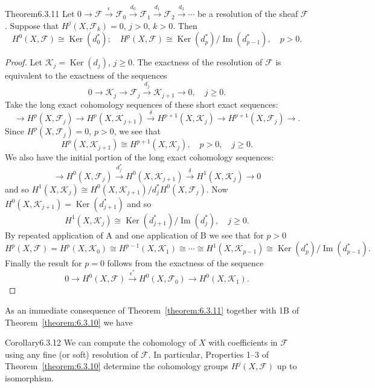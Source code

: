 \begin{originaltheorem}{Theorem}{6.3.11}
Let $0\to\mathcal F\xrightarrow\epsilon\mathcal F_0\xrightarrow{d_0}\mathcal F_1\xrightarrow{d_1}\mathcal F_2\xrightarrow{d_2}\cdots$ be a resolution of the sheaf $\mathcal F$. Suppose that $H^j(X,\mathcal F_k)=0$, $j>0$, $k>0$. Then
\[
H^0(X,\mathcal F)\cong\operatorname{Ker}(d_0^*);\quad H^p(X,\mathcal F)\cong\operatorname{Ker}(d_p^*)/\operatorname{Im}(d_{p-1}^*),\quad p>0.
\]
\end{originaltheorem}
\begin{proof}
Let $\mathcal K_j=\operatorname{Ker}(d_j)$, $j\geq0$. The exactness of the resolution of $\mathcal F$ is equivalent to the exactness of the sequences
\[
0\to\mathcal K_j\to\mathcal F_j\xrightarrow{d_j}\mathcal K_{j+1}\to0,\quad j\geq0.
\]
Take the long exact cohomology sequences of these short exact sequences:
\[
\to H^p(X,\mathcal F_j)\to H^p(X,\mathcal K_{j+1})\xrightarrow\delta H^{p+1}(X,\mathcal K_j)\to H^{p+1}(X,\mathcal F_j)\to.
\]
Since $H^p(X,\mathcal F_j)=0$, $p>0$, we see that
\begin{equation}\tag{A}\label{eq:6:a:1}
H^p(X,\mathcal K_{j+1})\cong H^{p+1}(X,\mathcal K_j),\quad p>0,\quad j\geq0.
\end{equation}
We also have the initial portion of the long exact cohomology sequences:
\[
\to H^0(X,\mathcal F_j)\xrightarrow{d_j^*}H^0(X,\mathcal K_{j+1})\xrightarrow\delta H^1(X,\mathcal K_j)\to0
\]
and so $H^1(X,\mathcal K_j)\cong H^0(X,\mathcal K_{j+1})/d_j^*H^0(X,\mathcal F_j)$. Now $H^0(X,\mathcal K_{j+1})=\operatorname{Ker}(d_{j+1}^*)$ and so
\begin{equation}\tag{B}\label{eq:6:b:1}
H^1(X,\mathcal K_j)\cong\operatorname{Ker}(d_{j+1}^*)/\operatorname{Im}(d_j^*),\quad j\geq0.
\end{equation}
By repeated application of A and one application of B we see that for $p>0$
\[
H^p(X,\mathcal F)=H^p(X,\mathcal K_0)\cong H^{p-1}(X,\mathcal K_1)\cong\cdots\cong H^1(X,\mathcal K_{p-1})\cong\operatorname{Ker}(d_p^*)/\operatorname{Im}(d_{p-1}^*).
\]
Finally the result for $p=0$ follows from the exactness of the sequence
\[
0\to H^0(X,\mathcal F)\xrightarrow{\epsilon^*}H^0(X,\mathcal F_0)\to H^0(X,\mathcal K_1).
\]
\end{proof}
As an immediate consequence of Theorem~\ref{theorem:6.3.11} together with 1B of Theorem~\ref{theorem:6.3.10} we have
\begin{originaltheorem}{Corollary}{6.3.12}
We can compute the cohomology of $X$ with coefficients in $\mathcal F$ using any fine (or soft) resolution of $\mathcal F$. In particular, Properties 1--3 of Theorem~\ref{theorem:6.3.10} determine the cohomology groups $H^j(X,\mathcal F)$ up to isomorphism.
\end{originaltheorem}
